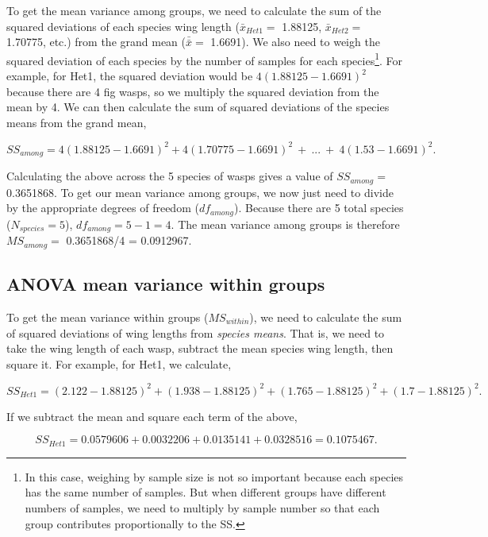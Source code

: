 \documentclass[
  openany]{scrbook}
\begin{document}
To get the mean variance among groups, we need to calculate the sum of the squared deviations of each species wing length (\(\bar{x}_{Het1} =\) 1.88125, \(\bar{x}_{Het2} =\) 1.70775, etc.) from the grand mean (\(\bar{\bar{x}} =\) 1.6691).
We also need to weigh the squared deviation of each species by the number of samples for each species\footnote{In this case, weighing by sample size is not so important because each species has the same number of samples. But when different groups have different numbers of samples, we need to multiply by sample number so that each group contributes proportionally to the SS.}.
For example, for Het1, the squared deviation would be \(4(1.88125 - 1.6691)^{2}\) because there are 4 fig wasps, so we multiply the squared deviation from the mean by 4.
We can then calculate the sum of squared deviations of the species means from the grand mean,

\[SS_{among} = 4(1.88125 - 1.6691)^{2} + 
               4(1.70775 - 1.6691)^{2}\:+\: ... \:
               +\:4(1.53 - 1.6691)^{2}.\]

Calculating the above across the 5 species of wasps gives a value of \(SS_{among} =\) 0.3651868.
To get our mean variance among groups, we now just need to divide by the appropriate degrees of freedom (\(df_{among}\)).
Because there are 5 total species (\(N_{species} = 5\)), \(df_{among} = 5 - 1 = 4\).
The mean variance among groups is therefore \(MS_{among} =\) 0.3651868/4 = 0.0912967.

\hypertarget{anova-mean-variance-within-groups}{%
\subsection{ANOVA mean variance within groups}\label{anova-mean-variance-within-groups}}

To get the mean variance within groups (\(MS_{within}\)), we need to calculate the sum of squared deviations of wing lengths from \emph{species means}.
That is, we need to take the wing length of each wasp, subtract the mean species wing length, then square it.
For example, for Het1, we calculate,

\[SS_{Het1} = (2.122 - 1.88125)^{2} + 
              (1.938 - 1.88125)^{2} +
              (1.765 - 1.88125)^{2} +
              (1.7 - 1.88125)^{2}.\]

If we subtract the mean and square each term of the above,

\[SS_{Het1} = 0.0579606 + 
              0.0032206 +
              0.0135141 +
              0.0328516 = 0.1075467.\]
\end{document}
